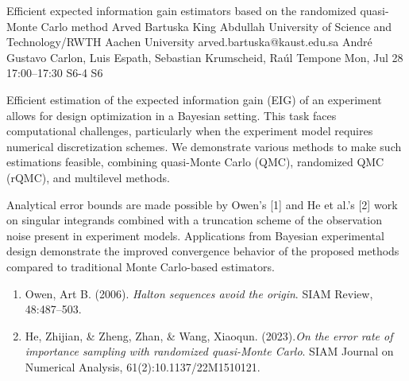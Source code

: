 \begin{talk}
  {Efficient expected information gain estimators based on the randomized quasi-Monte Carlo method}%
  {Arved Bartuska}%
  {King Abdullah University of Science and Technology/RWTH Aachen University}%
  {arved.bartuska@kaust.edu.sa}%
  {Andr\'{e} Gustavo Carlon, Luis Espath, Sebastian Krumscheid, Ra\'{u}l Tempone}%
  {}%
  {Mon, Jul 28 17:00--17:30}%
  {S6-4}%
  {S6}%
  
    
   
Efficient estimation of the expected information gain (EIG) of an experiment allows for design optimization in a Bayesian setting. This task faces computational challenges, particularly when the experiment model requires numerical discretization schemes. We demonstrate various methods to make such estimations feasible, combining quasi-Monte Carlo (QMC), randomized QMC (rQMC), and multilevel methods.

Analytical error bounds are made possible by Owen's [1] and He et al.'s [2] work on singular integrands combined with a truncation scheme of the observation noise present in experiment models. Applications from Bayesian experimental design demonstrate the improved convergence behavior of the proposed methods compared to traditional Monte Carlo-based estimators.

\medskip

\begin{enumerate}
 \item[{[1]}] Owen, Art B. (2006). {\it Halton sequences avoid the origin}. SIAM Review, 48:487--503.
 \item[{[2]}] He, Zhijian, \& Zheng, Zhan, \& Wang, Xiaoqun. (2023).{\it On the error rate of importance sampling with randomized quasi-Monte Carlo}. SIAM Journal
on Numerical Analysis,  61(2):10.1137/22M1510121.
\end{enumerate}

\end{talk}


